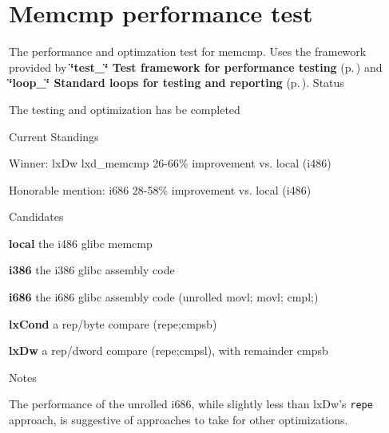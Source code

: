 \section{Memcmp performance test}
\label{group__memcmp__test}
The performance and optimzation test for memcmp. Uses the framework provided by {\bf \char`\"{}test\_\-\char`\"{} Test framework for performance testing} {\rm (p.\,\pageref{group__test})} and {\bf \char`\"{}loop\_\-\char`\"{} Standard loops for testing and reporting} {\rm (p.\,\pageref{group__loop__test})}. 
Status

The testing and optimization has be completed

Current Standings

\begin{CompactItemize}
\item 
Winner: lx\-Dw lxd\_\-memcmp 26-66\% improvement vs. local (i486)\item 
Honorable mention: i686 28-58\% improvement vs. local (i486)\end{CompactItemize}
Candidates

\begin{CompactItemize}
\item 
{\bf local} the i486 glibc memcmp\item 
{\bf i386} the i386 glibc assembly code\item 
{\bf i686} the i686 glibc assembly code (unrolled movl; movl; cmpl;)\item 
{\bf lx\-Cond} a rep/byte compare (repe;cmpsb)\item 
{\bf lx\-Dw} a rep/dword compare (repe;cmpsl), with remainder cmpsb\end{CompactItemize}
Notes

The performance of the unrolled i686, while slightly less than lx\-Dw's {\tt repe} approach, is suggestive of approaches to take for other optimizations. 